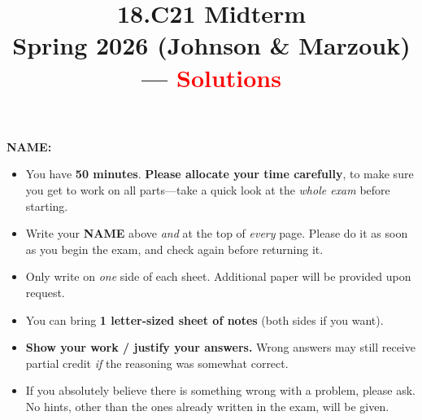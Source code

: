 \documentclass[12pt]{article}
\title{18.C21 Midterm \\
Spring 2026 (Johnson \& Marzouk)
\ifdefined\solutions
--- \textcolor{red}{Solutions}
\fi
}
\author{}
\date{}
\begin{document}
\maketitle

\ifx\solutions\undefined

{\vspace{0.5cm} \hspace{1cm}
{\Large \textbf{NAME:} \dotfill}
\hspace{2cm}\ \vspace{0.5cm}}

\fi

\begin{itemize}

\item You have \textbf{50 minutes}.  \textbf{Please allocate your time carefully}, to make sure you get to work on all parts---take a quick look at the \emph{whole exam} before starting.

\item Write your \textbf{NAME} above \emph{and} at the top of \emph{every} page. Please do it as soon as you begin the exam, and check again before returning it. 

\item Only write on \emph{one} side of each sheet.  Additional paper will be provided upon request.

\item You can bring \textbf{1 letter-sized sheet of notes} (both sides if you want).

\item \textbf{Show your work / justify your answers.}  Wrong answers may still receive partial credit \emph{if} the reasoning was somewhat correct.

\item If you absolutely believe there is something wrong with a problem, please ask. No hints, other than the ones already written in the exam, will be given.


\end{itemize}
\end{document}
